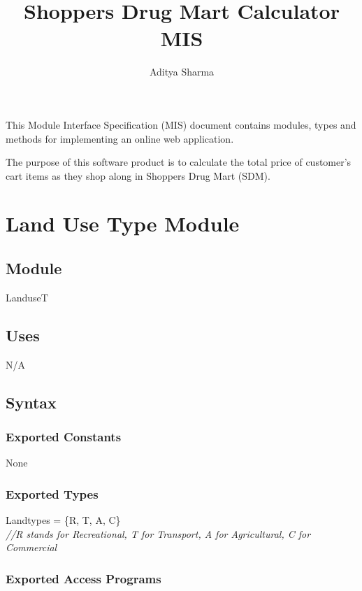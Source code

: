 \documentclass[12pt]{article}
\title{Shoppers Drug Mart Calculator MIS}
\author{Aditya Sharma}
\begin{document}
\maketitle
This Module Interface Specification (MIS) document contains modules, types and
methods for implementing an online web application.

The purpose of this software product is to calculate the total price of customer's
cart items as they shop along in Shoppers Drug Mart (SDM).




\newpage

\section* {Land Use Type Module}

\subsection*{Module}

LanduseT

\subsection* {Uses}

N/A

\subsection* {Syntax}

\subsubsection* {Exported Constants}

None

\subsubsection* {Exported Types}

Landtypes = \{R, T, A, C\}\\

\noindent \textit{//R stands for Recreational, T for Transport, A for Agricultural, C for
  Commercial}

\subsubsection* {Exported Access Programs}
\end{document}
